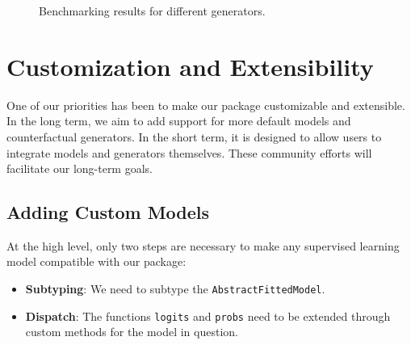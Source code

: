 \documentclass{juliacon}
\providecommand{\tightlist}{%
  \setlength{\itemsep}{0pt}\setlength{\parskip}{0pt}}\usepackage{longtable,booktabs,array}
\begin{document}
\begin{figure}


\caption{\label{fig-bmk}Benchmarking results for different generators.}

\end{figure}%

\section{Customization and Extensibility}\label{sec-custom}

One of our priorities has been to make our package customizable and
extensible. In the long term, we aim to add support for more default
models and counterfactual generators. In the short term, it is designed
to allow users to integrate models and generators themselves. These
community efforts will facilitate our long-term goals.

\subsection{Adding Custom Models}\label{sec-custom-mod}

At the high level, only two steps are necessary to make any supervised
learning model compatible with our package:

\begin{itemize}
\tightlist
\item
  \textbf{Subtyping}: We need to subtype the
  \texttt{AbstractFittedModel}.
\item
  \textbf{Dispatch}: The functions \texttt{logits} and \texttt{probs}
  need to be extended through custom methods for the model in question.
\end{itemize}
\end{document}
